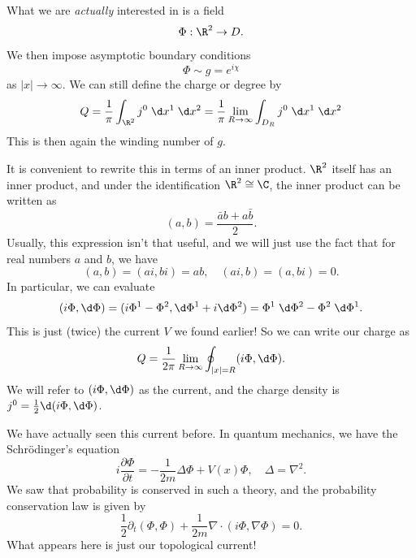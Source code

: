 \documentclass[a4paper]{article}
\begin{document}
What we are \emph{actually} interested in is a field
\[
  \Phi: \R^2 \to D.
\]
We then impose asymptotic boundary conditions
\[
  \Phi \sim g = e^{i\chi}
\]
as $|x| \to \infty$. We can still define the charge or degree by
\[
  Q = \frac{1}{\pi} \int_{\R^2} j^0 \;\d x^1 \;\d x^2 = \frac{1}{\pi} \lim_{R \to \infty}\int_{D_R} j^0 \;\d x^1 \;\d x^2
\]
This is then again the winding number of $g$.

It is convenient to rewrite this in terms of an inner product. $\R^2$ itself has an inner product, and under the identification $\R^2 \cong \C$, the inner product can be written as
\[
  (a, b) = \frac{\bar{a} b + a \bar{b}}{2}.
\]
Usually, this expression isn't that useful, and we will just use the fact that for real numbers $a$ and $b$, we have
\[
  (a, b) = (ai, bi) = ab, \quad (ai, b) = (a, bi) = 0.
\]
In particular, we can evaluate
\[
  (i \Phi, \d \Phi) = (i \Phi^1 - \Phi^2, \d \Phi^1 + i \d \Phi^2) = \Phi^1\;\d \Phi^2 - \Phi^2\;\d \Phi^1.
\]
This is just (twice) the current $V$ we found earlier! So we can write our charge as
\[
  Q = \frac{1}{2\pi} \lim_{R \to \infty} \oint_{|x| = R} (i \Phi, \d \Phi).
\]
We will refer to $(i \Phi, \d \Phi)$ as the current, and the charge density is $j^0 = \frac{1}{2} \d (i \Phi, \d \Phi)$.


We have actually seen this current before. In quantum mechanics, we have the Schr\"odinger's equation
\[
  i \frac{\partial \Phi}{\partial t} = - \frac{1}{2m} \Delta \Phi + V(x) \Phi,\quad \Delta = \nabla^2.
\]
We saw that probability is conserved in such a theory, and the probability conservation law is given by
\[
  \frac{1}{2} \partial_t (\Phi, \Phi) + \frac{1}{2m} \nabla \cdot (i \Phi, \nabla \Phi) = 0.
\]
What appears here is just our topological current!
\end{document}
